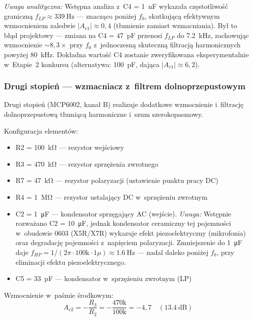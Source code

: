 \documentclass[a4paper,11pt]{article}
\begin{document}
	\textit{Uwaga analityczna:} Wstępna analiza z~C4 = \SI{1}{\nano\farad}
	wykazała częstotliwość graniczną $f_{LP} \approx \SI{339}{\hertz}$ --- znacząco
	poniżej $f_0$, skutkującą efektywnym wzmocnieniem zaledwie $|A_{v1}| \approx 0{,}4$
	(tłumienie zamiast wzmacniania). Był to błąd projektowy --- zmiana na
	C4 = \SI{47}{\pico\farad} przenosi $f_{LP}$ do \SI{7,2}{\kilo\hertz}, zachowując
	wzmocnienie ${\sim}8{,}3\times$ przy $f_0$ z~jednoczesną skuteczną filtracją
	harmonicznych powyżej \SI{80}{\kilo\hertz}. Dokładna wartość C4 zostanie
	zweryfikowana eksperymentalnie w~Etapie~2 konkursu (alternatywa: \SI{100}{\pico\farad},
	dająca $|A_{v1}| \approx 6{,}2$).
	
	\subsubsection{Drugi stopień --- wzmacniacz z~filtrem dolnoprzepustowym}
	
	Drugi stopień (MCP6002, kanał B) realizuje dodatkowe wzmocnienie
	i~filtrację dolnoprzepustową tłumiącą harmoniczne i~szum szerokopasmowy.
	
	Konfiguracja elementów:
	\begin{itemize}[nosep]
		\item R2 = \SI{100}{\kilo\ohm} --- rezystor wejściowy
		\item R3 = \SI{470}{\kilo\ohm} --- rezystor sprzężenia zwrotnego
		\item R7 = \SI{47}{\kilo\ohm} --- rezystor polaryzacji (ustawienie punktu pracy DC)
		\item R4 = \SI{1}{\mega\ohm} --- rezystor ustalający DC w~sprzężeniu zwrotnym
		\item C2 = \SI{1}{\micro\farad} --- kondensator sprzęgający AC (wejście).
		\textit{Uwaga:} Wstępnie rozważano C2 = \SI{10}{\micro\farad}, jednak
		kondensator ceramiczny tej pojemności w~obudowie 0603 (X5R/X7R) wykazuje
		efekt piezoelektryczny (mikrofonia) oraz degradację pojemności z~napięciem
		polaryzacji. Zmniejszenie do \SI{1}{\micro\farad} daje
		$f_{HP} = 1/(2\pi \cdot 100\text{k} \cdot 1\mu) \approx \SI{1,6}{\hertz}$
		--- nadal daleko poniżej $f_0$, przy eliminacji efektu piezoelektrycznego.
		\item C5 = \SI{33}{\pico\farad} --- kondensator w~sprzężeniu zwrotnym (LP)
	\end{itemize}
	
	Wzmocnienie w~paśmie środkowym:
	\begin{equation}
		A_{v2} = -\frac{R_3}{R_2} = -\frac{470\text{k}}{100\text{k}} = -4{,}7 \quad (\SI{13,4}{\deci\bel})
		\label{eq:gain2}
	\end{equation}
	
\end{document}
